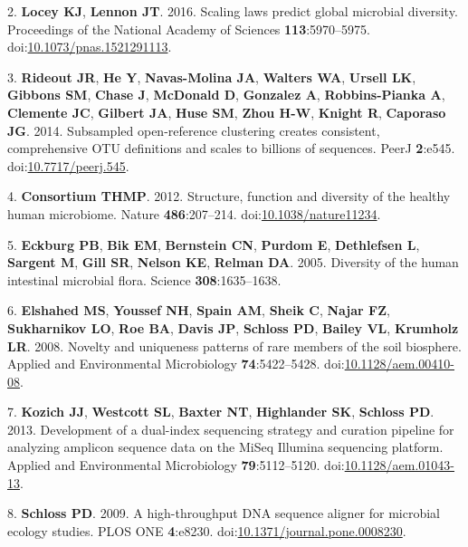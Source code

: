 \documentclass[11pt,]{article}
\begin{document}
\hypertarget{ref-Locey2016}{}
2. \textbf{Locey KJ}, \textbf{Lennon JT}. 2016. Scaling laws predict
global microbial diversity. Proceedings of the National Academy of
Sciences \textbf{113}:5970--5975.
doi:\href{https://doi.org/10.1073/pnas.1521291113}{10.1073/pnas.1521291113}.

\hypertarget{ref-Rideout2014}{}
3. \textbf{Rideout JR}, \textbf{He Y}, \textbf{Navas-Molina JA},
\textbf{Walters WA}, \textbf{Ursell LK}, \textbf{Gibbons SM},
\textbf{Chase J}, \textbf{McDonald D}, \textbf{Gonzalez A},
\textbf{Robbins-Pianka A}, \textbf{Clemente JC}, \textbf{Gilbert JA},
\textbf{Huse SM}, \textbf{Zhou H-W}, \textbf{Knight R}, \textbf{Caporaso
JG}. 2014. Subsampled open-reference clustering creates consistent,
comprehensive OTU definitions and scales to billions of sequences. PeerJ
\textbf{2}:e545.
doi:\href{https://doi.org/10.7717/peerj.545}{10.7717/peerj.545}.

\hypertarget{ref-Huttenhower2012}{}
4. \textbf{Consortium THMP}. 2012. Structure, function and diversity of
the healthy human microbiome. Nature \textbf{486}:207--214.
doi:\href{https://doi.org/10.1038/nature11234}{10.1038/nature11234}.

\hypertarget{ref-Eckburg2005}{}
5. \textbf{Eckburg PB}, \textbf{Bik EM}, \textbf{Bernstein CN},
\textbf{Purdom E}, \textbf{Dethlefsen L}, \textbf{Sargent M},
\textbf{Gill SR}, \textbf{Nelson KE}, \textbf{Relman DA}. 2005.
Diversity of the human intestinal microbial flora. Science
\textbf{308}:1635--1638.

\hypertarget{ref-Elshahed2008}{}
6. \textbf{Elshahed MS}, \textbf{Youssef NH}, \textbf{Spain AM},
\textbf{Sheik C}, \textbf{Najar FZ}, \textbf{Sukharnikov LO},
\textbf{Roe BA}, \textbf{Davis JP}, \textbf{Schloss PD}, \textbf{Bailey
VL}, \textbf{Krumholz LR}. 2008. Novelty and uniqueness patterns of rare
members of the soil biosphere. Applied and Environmental Microbiology
\textbf{74}:5422--5428.
doi:\href{https://doi.org/10.1128/aem.00410-08}{10.1128/aem.00410-08}.

\hypertarget{ref-Kozich2013}{}
7. \textbf{Kozich JJ}, \textbf{Westcott SL}, \textbf{Baxter NT},
\textbf{Highlander SK}, \textbf{Schloss PD}. 2013. Development of a
dual-index sequencing strategy and curation pipeline for analyzing
amplicon sequence data on the MiSeq Illumina sequencing platform.
Applied and Environmental Microbiology \textbf{79}:5112--5120.
doi:\href{https://doi.org/10.1128/aem.01043-13}{10.1128/aem.01043-13}.

\hypertarget{ref-Schloss2009a}{}
8. \textbf{Schloss PD}. 2009. A high-throughput DNA sequence aligner for
microbial ecology studies. PLOS ONE \textbf{4}:e8230.
doi:\href{https://doi.org/10.1371/journal.pone.0008230}{10.1371/journal.pone.0008230}.
\end{document}
